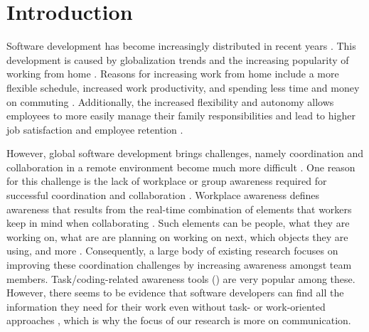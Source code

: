 \chapter{Introduction}
\label{chapter:introduction}
Software development has become increasingly distributed in recent years \autocite{herbsleb2001global}. This development is caused by globalization trends \autocite{herbsleb2007global} and the increasing popularity of working from home \autocite{ecoWorkingFromHome2021}. Reasons for increasing work from home include a more flexible schedule, increased work productivity, and spending less time and money on commuting \autocite{flores2019understanding, mulki2009set}. Additionally, the increased flexibility and autonomy allows employees to more easily manage their family responsibilities and lead to higher job satisfaction and employee retention \autocite{mulki2009set, gajendran2007good, madsen2011benefits}.

However, global software development brings challenges, namely coordination and collaboration in a remote environment become much more difficult \autocite{herbsleb2007global}. One reason for this challenge is the lack of workplace or group awareness required for successful coordination and collaboration \autocite{herbsleb2007global, gutwin2004group}. Workplace awareness defines awareness that results from the real-time combination of elements that workers keep in mind when collaborating \autocite{gutwin1996workspace}. Such elements can be people, what they are working on, what are are planning on working on next, which objects they are using, and more \autocite{gutwin1996workspace}. Consequently, a large body of existing research focuses on improving these coordination challenges by increasing awareness amongst team members. Task/coding-related awareness tools (\autocite{biehl2007fastdash, jakobsen2009wipdash}) are very popular among these. However, there seems to be evidence that software developers can find all the information they need for their work even without task- or work-oriented approaches \autocite{gutwin2004group}, which is why the focus of our research is more on communication.

